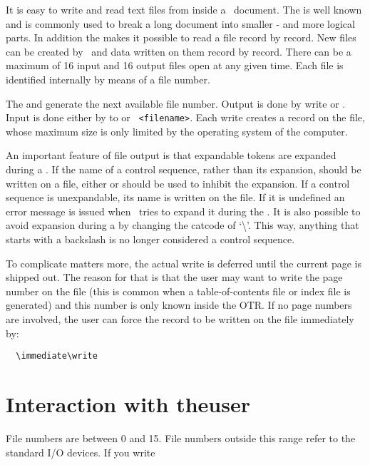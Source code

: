 It is easy to write and read text files from inside a \tex\  document. The  is well known and is commonly used
to break a long document into smaller - and more logical parts. In addition the  makes it  possible to
read a file record by record. New files can be created by \tex\ and data written on them record by record. There can be
a maximum of 16 input and 16 output files open at any given time. Each file
is identified  internally by means of a file number. 

The  and  generate the next available file number. 
Output is done by write or . Input is done either by  to or 
\verb+ <filename>+. Each write creates a record on the file, whose maximum size is only limited
by the operating system of the computer.

An important feature of file output is that expandable tokens are expanded during a . If the
name of a control sequence, rather than its expansion, should be written on a file, either
 or  should be used to inhibit the expansion. If a control sequence is unexpandable,
its name is written on the file. If it is undefined an error message is issued when \tex\ tries to expand it during
the . It is also possible to avoid expansion during a  by changing the catcode of `\textbackslash'.
This way, anything that starts with a backslash is no longer considered a control sequence.

To complicate matters more, the actual write is deferred until the current page is shipped out. The reason for that is that the user may want to write the page number on the file (this is common when a table-of-contents file or index file is generated) and this number is only known inside the OTR. If no page numbers are involved, the user can force the record to be written on the file immediately by:

\begin{Verbatim}
  \immediate\write
\end{Verbatim}

\section{Interaction with theuser}



File numbers are between 0 and 15. File numbers outside this range refer to the standard I/O devices. If you 
write

